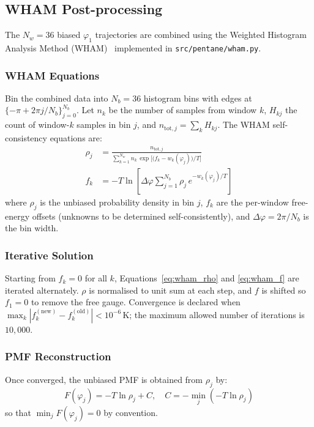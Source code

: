 \documentclass[12pt,a4paper]{article}
\begin{document}
\subsection{WHAM Post-processing}
The $N_w = 36$ biased $\varphi_1$ trajectories are combined using the
Weighted Histogram Analysis Method (WHAM)~\citep{Kumar1992} implemented in
\texttt{src/pentane/wham.py}.

\subsubsection{WHAM Equations}
Bin the combined data into $N_b = 36$ histogram bins with edges at
$\{-\pi + 2\pi j/N_b\}_{j=0}^{N_b}$.  Let $n_k$ be the number of
samples from window $k$, $H_{kj}$ the count of window-$k$ samples
in bin $j$, and $n_{\mathrm{tot},j} = \sum_k H_{kj}$.  The WHAM
self-consistency equations are:
\begin{align}
  \rho_j &= \frac{n_{\mathrm{tot},j}}
    {\displaystyle\sum_{k=1}^{N_w} n_k\,
     \exp\!\bigl[\bigl(f_k - w_k(\varphi_j)\bigr)/T\bigr]}
  \label{eq:wham_rho} \\[4pt]
  f_k    &= -T \ln\!\left[\Delta\varphi\sum_{j=1}^{N_b}
    \rho_j\,e^{-w_k(\varphi_j)/T}\right]
  \label{eq:wham_f}
\end{align}
where $\rho_j$ is the unbiased probability density in bin $j$,
$f_k$ are the per-window free-energy offsets (unknowns to be determined
self-consistently), and $\Delta\varphi = 2\pi/N_b$ is the bin width.

\subsubsection{Iterative Solution}
Starting from $f_k = 0$ for all $k$, Equations~\eqref{eq:wham_rho} and
\eqref{eq:wham_f} are iterated alternately.  $\rho$ is normalised to
unit sum at each step, and $f$ is shifted so $f_1 = 0$ to remove the
free gauge.  Convergence is declared when
$\max_k |f_k^{(\text{new})} - f_k^{(\text{old})}| < 10^{-6}$\,K;
the maximum allowed number of iterations is $10{,}000$.

\subsubsection{PMF Reconstruction}
Once converged, the unbiased PMF is obtained from $\rho_j$ by:
\begin{equation}
  F(\varphi_j) = -T \ln \rho_j + C, \quad
  C = -\min_j(-T\ln\rho_j)
  \label{eq:wham_pmf}
\end{equation}
so that $\min_j F(\varphi_j) = 0$ by convention.
\end{document}
